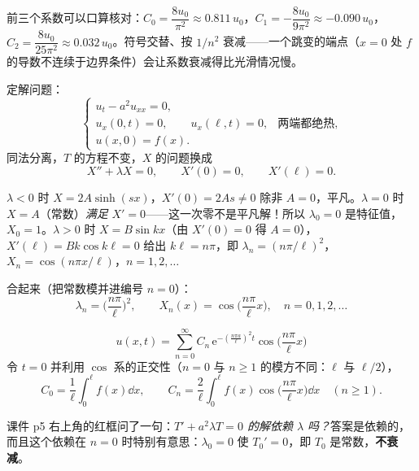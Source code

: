 前三个系数可以口算核对：$C_0=\dfrac{8u_0}{\pi^2}\approx0.811\,u_0$，$C_1=-\dfrac{8u_0}{9\pi^2}\approx-0.090\,u_0$，$C_2=\dfrac{8u_0}{25\pi^2}\approx0.032\,u_0$。符号交替、按 $1/n^2$ 衰减——一个跳变的端点（$x=0$ 处 $f$ 的导数不连续于边界条件）会让系数衰减得比光滑情况慢。


定解问题：
\begin{equation}
  \begin{cases}
    u_t-a^2u_{xx}=0,\\
    u_x(0,t)=0,\qquad u_x(\ell,t)=0, & \text{两端都绝热},\\
    u(x,0)=f(x).
  \end{cases}
\end{equation}
同法分离，$T$ 的方程不变，$X$ 的问题换成
\begin{equation}
  X''+\lambda X=0,\qquad X'(0)=0,\qquad X'(\ell)=0 .
\end{equation}

$\lambda<0$ 时 $X=2A\sinh(sx)$，$X'(0)=2As\neq0$ 除非 $A=0$，平凡。$\lambda=0$ 时 $X=A$（常数）\emph{满足} $X'=0$——这一次零不是平凡解！所以 $\lambda_0=0$ 是特征值，$X_0=1$。$\lambda>0$ 时 $X=B\sin kx$（由 $X'(0)=0$ 得 $A=0$），$X'(\ell)=Bk\cos k\ell=0$ 给出 $k\ell=n\pi$，即 $\lambda_n=(n\pi/\ell)^2$，$X_n=\cos(n\pi x/\ell)$，$n=1,2,\dots$

合起来（把常数模并进编号 $n=0$）：
\begin{equation}
  \boxed{\;\lambda_n=\Big(\frac{n\pi}{\ell}\Big)^2,\qquad X_n(x)=\cos\Big(\frac{n\pi}{\ell}x\Big),\quad n=0,1,2,\dots\;}
\end{equation}

\begin{equation}
  u(x,t)=\sum_{n=0}^{\infty}C_n\,\mathrm e^{-\left(\frac{n\pi a}{\ell}\right)^2t}\cos\Big(\frac{n\pi}{\ell}x\Big)
\end{equation}
令 $t=0$ 并利用 $\cos$ 系的正交性（$n=0$ 与 $n\ge1$ 的模方不同：$\ell$ 与 $\ell/2$），
\begin{equation}
  C_0=\frac{1}{\ell}\int_0^{\ell}f(x)\dd x,\qquad
  C_n=\frac{2}{\ell}\int_0^{\ell}f(x)\cos\Big(\frac{n\pi}{\ell}x\Big)\dd x\quad(n\ge1).
\end{equation}


课件 p5 右上角的红框问了一句：\emph{$T'+a^2\lambda T=0$ 的解依赖 $\lambda$ 吗？}答案是依赖的，而且这个依赖在 $n=0$ 时特别有意思：$\lambda_0=0$ 使 $T_0'=0$，即 $T_0$ 是常数，\textbf{不衰减}。

